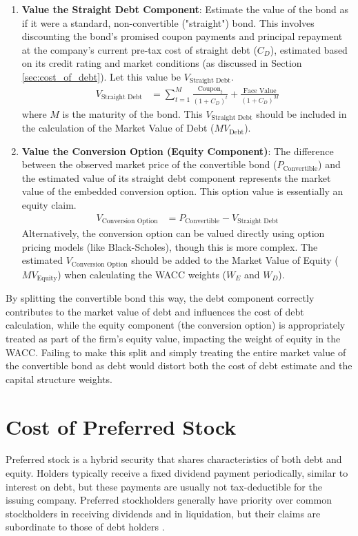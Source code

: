 \begin{enumerate}
    \item \textbf{Value the Straight Debt Component}: Estimate the value of the bond as if it were a standard, non-convertible ("straight") bond. This involves discounting the bond's promised coupon payments and principal repayment at the company's current pre-tax cost of straight debt (\(C_D\)), estimated based on its credit rating and market conditions (as discussed in Section \ref{sec:cost_of_debt}). Let this value be \(V_{\text{Straight Debt}}\).
          \begin{align*}
              V_{\text{Straight Debt}} & = \sum_{t=1}^{M} \frac{\text{Coupon}_t}{(1+C_D)^t} + \frac{\text{Face Value}}{(1+C_D)^M}
          \end{align*}
          where \(M\) is the maturity of the bond. This \(V_{\text{Straight Debt}}\) should be included in the calculation of the Market Value of Debt (\(MV_{\text{Debt}}\)).
    \item \textbf{Value the Conversion Option (Equity Component)}: The difference between the observed market price of the convertible bond (\(P_{\text{Convertible}}\)) and the estimated value of its straight debt component represents the market value of the embedded conversion option. This option value is essentially an equity claim.
          \begin{align*}
              V_{\text{Conversion Option}} & = P_{\text{Convertible}} - V_{\text{Straight Debt}}
          \end{align*}
          Alternatively, the conversion option can be valued directly using option pricing models (like Black-Scholes), though this is more complex. The estimated \(V_{\text{Conversion Option}}\) should be added to the Market Value of Equity (\(MV_{\text{Equity}}\)) when calculating the WACC weights (\(W_E\) and \(W_D\)).
\end{enumerate}

By splitting the convertible bond this way, the debt component correctly contributes to the market value of debt and influences the cost of debt calculation, while the equity component (the conversion option) is appropriately treated as part of the firm's equity value, impacting the weight of equity in the WACC. Failing to make this split and simply treating the entire market value of the convertible bond as debt would distort both the cost of debt estimate and the capital structure weights.

\section{Cost of Preferred Stock} \label{sec:cost_of_preferred_stock}
Preferred stock is a hybrid security that shares characteristics of both debt and equity. Holders typically receive a fixed dividend payment periodically, similar to interest on debt, but these payments are usually not tax-deductible for the issuing company. Preferred stockholders generally have priority over common stockholders in receiving dividends and in liquidation, but their claims are subordinate to those of debt holders \parencite{brealey2020principles}.

